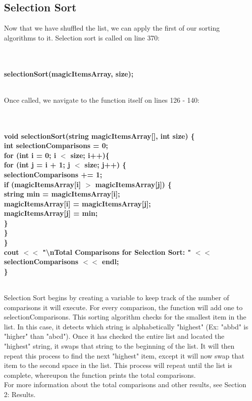 \documentclass{article}
\begin{document}
\subsection{Selection Sort}
Now that we have shuffled the list, we can apply the first of our sorting algorithms to it. Selection sort is called on line 370: 

\textbf{
\\~\\ \indent selectionSort(magicItemsArray, size);\\~\\ }

Once called, we navigate to the function itself on lines 126 - 140: 

\textbf{
\\~\\void selectionSort(string magicItemsArray[], int size) \{\\
    \indent int selectionComparisons = 0;\\
    \indent for (int i = 0; i $<$ size; i++)\{\\
        \indent \indent for (int j = i + 1; j $<$ size; j++) \{\\
            \indent \indent \indent selectionComparisons += 1;\\
            \indent \indent \indent if (magicItemsArray[i] $>$ magicItemsArray[j]) \{\\
                \indent \indent \indent \indent string min = magicItemsArray[i];\\
                \indent \indent \indent \indent magicItemsArray[i] = magicItemsArray[j];\\
                \indent \indent \indent \indent magicItemsArray[j] = min;\\
            \indent \indent \indent \}\\
        \indent \indent \}\\
    \indent \}\\
    \indent cout $<<$ "\textbackslash nTotal Comparisons for Selection Sort: " $<<$ selectionComparisons $<<$ endl;\\
\}\\~\\ }

Selection Sort begins by creating a variable to keep track of the number of comparisons it will execute. For every comparison, the function will add one to selectionComparisons. This sorting algorithm checks for the smallest item in the list. In this case, it detects which string is alphabetically "highest" (Ex: "abbd" is "higher" than "abcd"). Once it has checked the entire list and located the "highest" string, it swaps that string to the beginning of the list. It will then repeat this process to find the next "highest" item, except it will now swap that item to the second space in the list. This process will repeat until the list is complete, whereupon the function prints the total comparisons.
\\For more information about the total comparisons and other results, see Section 2: Results.
\end{document}
